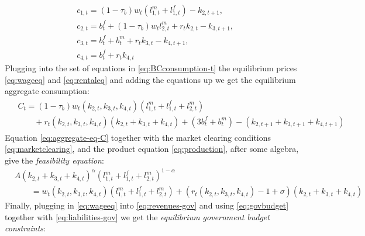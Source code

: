 \documentclass[ProjectUYA]{subfiles}
\begin{document}
\begin{equation}
	\label{eq:BCconsumption-t}
	\begin{aligned}
	&c_{1,t}   = (1-\tau_b)w_t (l_{1,t}^m +l_{1,t}^f) -k_{2,t+1} ,\\
 	&c_{2,t}   = b_{t}^f+(1-\tau_b)w_{t} l_{2,t}^m  + r_{t}k_{2,t} -k_{3,t+1}  ,\\
 	&c_{3,t}   = b_{t}^f+ b_{t}^m  + r_{t}k_{3,t} -k_{4,t+1}  ,\\
 	&c_{4,t}  = b_{t}^f + r_{t}k_{4,t}
\end{aligned}
\end{equation}
Plugging into the set of equations in \eqref{eq:BCconsumption-t} the equilibrium prices \eqref{eq:wageeq} and \eqref{eq:rentaleq} and adding the equations up we get the equilibrium aggregate consumption:
\begin{equation}
	\label{eq:aggregate-eq-C}
	\begin{gathered}
	\begin{aligned}
			&C_t= (1-\tau_b)w_t(k_{2,t},k_{3,t},k_{4,t})(l_{1,t}^m +l_{1,t}^f + l_{2,t}^m )\\
                &\qquad + r_t(k_{2,t}, k_{3,t}, k_{4,t})(k_{2,t}+k_{3,t}+k_{4,t})  + (3b_{t}^f + b_{t}^m )
			 -(k_{2,t+1} +k_{3,t+1} +k_{4,t+1} )
			 \end{aligned}
	\end{gathered}
\end{equation}
Equation \eqref{eq:aggregate-eq-C} together with the market clearing conditions \eqref{eq:marketclearing}, and the product equation \eqref{eq:production}, after some algebra, give the 
\emph{feasibility equation}:
\begin{equation}
	\label{eq:dyn-eq-feasibility}
	\begin{aligned}
	&A(k_{2,t}+k_{3,t}+k_{4,t})^\alpha (l_{1,t}^m +l_{1,t}^f + l_{2,t}^m)^{1-\alpha}\\
	&\qquad=w_t(k_{2,t},k_{3,t},k_{4,t})(l_{1,t}^m +l_{1,t}^f + l_{2,t}^m) + (r_t(k_{2,t}, k_{3,t}, k_{4,t})-1+\sigma) (k_{2,t}+k_{3,t}+k_{4,t})
	\end{aligned}
\end{equation}
Finally, plugging in \eqref{eq:wageeq} into \eqref{eq:revenues-gov} and using \eqref{eq:govbudget} together with  \eqref{eq:liabilities-gov} we get the \emph{equilibrium government budget constraints}:
\end{document}
